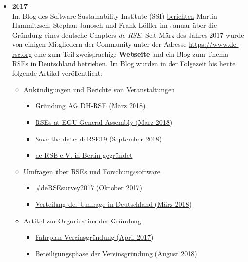 \begin{itemize}
 \item \textbf{2017}\\
 Im Blog des Software Sustainability Institute (SSI) \href{https://www.software.ac.uk/blog/2017-01-19-launching-german-rse-chapter-de-rse}{berichten} Martin Hammitzsch, Stephan Janosch und Frank Löffler im Januar über die Gründung eines deutsche Chapters \emph{de-RSE}.
 Seit März des Jahres 2017 wurde von einigen Mitgliedern der Community unter der Adresse \href{https://www.de-rse.org}{https://www.de-rse.org} eine zum Teil zweisprachige \textbf{Webseite} und ein Blog zum Thema RSEs in Deutschland betrieben.
 Im Blog wurden in der Folgezeit bis heute folgende Artikel veröffentlicht:
 \begin{itemize}
  \item Ankündigungen und Berichte von Veranstaltungen
   \begin{itemize}
   \item \href{https://www.de-rse.org/blog/2018/03/01/digital-humanities-im-deutschsprachigen-raum-gruenden-rse-ag.html}{Gründung AG DH-RSE (März 2018)}
   \item \href{https://www.de-rse.org/blog/2018/07/30/rses-at-egu-ga.html}{RSEs at EGU General Assembly (März 2018)}
   \item \href{https://www.de-rse.org/blog/2018/09/03/conference-for-research-software-engineers-in-germany-2019.html}{Save the date: deRSE19 (September 2018)}
   \item \href{https://www.de-rse.org/blog/2018/12/20/deRSE-gesellschaft-f\%C3\%BCr-forschungssoftware-in-berlin-gegr\%C3\%BCndet.html}{de-RSE e.V. in Berlin gegründet}
  \end{itemize}
 \item Umfragen über RSEs und Forschungssoftware
  \begin{itemize}
   \item \href{https://www.de-rse.org/blog/2017/10/19/survey-about-research-software-in-germany-2017.html}{\#deRSEsurvey2017 (Oktober 2017)}
   \item \href{https://www.de-rse.org/blog/2018/03/06/verteilung-der-umfrage-in-deutschland.html}{Verteilung der Umfrage in Deutschland (März 2018)}
  \end{itemize}
 \item Artikel zur Organisation der Gründung
  \begin{itemize}
   \item \href{https://www.de-rse.org/blog/2017/04/28/fahrplan.html}{Fahrplan Vereinsgründung (April 2017)}
   \item \href{https://www.de-rse.org/blog/2018/08/08/beteiligungphase-der-vereinsgr\%C3\%BCndung.html}{Beteiligungsphase der Vereinsgründung (August 2018)}

\end{itemize}
\end{itemize}
\end{itemize}

